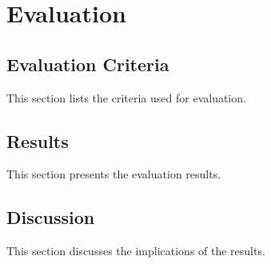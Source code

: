 \chapter{Evaluation}
\label{chap:evaluation}

\section{Evaluation Criteria}
This section lists the criteria used for evaluation.

\section{Results}
This section presents the evaluation results.

\section{Discussion}
This section discusses the implications of the results.
